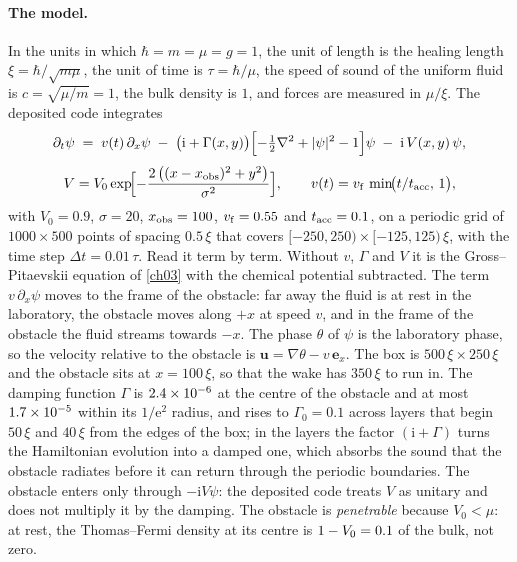 \paragraph{The model.} In the units in which $\hbar=m=\mu=g=1$, the unit of length is the healing length $\xi=\hbar/\sqrt{m\mu}$, the unit of time is $\tau=\hbar/\mu$, the speed of sound of the uniform fluid is $c=\sqrt{\mu/m}=1$, the bulk density is $1$, and forces are measured in $\mu/\xi$. The deposited code integrates
\begin{equation}\label{ch09:eq-model}
\partial_t\psi \;=\; v(t)\,\partial_x\psi\;-\;\bigl(\mathrm i+\Gamma(x,y)\bigr)\Bigl[-\tfrac12\nabla^2+|\psi|^2-1\Bigr]\psi\;-\;\mathrm i\,V(x,y)\,\psi ,
\end{equation}
\begin{equation}\label{ch09:eq-pot}
V=V_0\exp\!\Bigl[-\frac{2\,\bigl((x-x_{\rm obs})^2+y^2\bigr)}{\sigma^2}\Bigr],\qquad v(t)=v_{\rm f}\,\min\!\bigl(t/t_{\rm acc},\,1\bigr),
\end{equation}
with $V_0=0.9$, $\sigma=20$, $x_{\rm obs}=100$, $v_{\rm f}=0.55$ and $t_{\rm acc}=0.1$, on a periodic grid of $1000\times500$ points of spacing $0.5\,\xi$ that covers $[-250,250)\times[-125,125)\,\xi$, with the time step $\Delta t=0.01\,\tau$. Read it term by term. Without $v$, $\Gamma$ and $V$ it is the Gross--Pitaevskii equation of \cref{ch03} with the chemical potential subtracted. The term $v\,\partial_x\psi$ moves to the frame of the obstacle: far away the fluid is at rest in the laboratory, the obstacle moves along $+x$ at speed $v$, and in the frame of the obstacle the fluid streams towards $-x$. The phase $\theta$ of $\psi$ is the laboratory phase, so the velocity relative to the obstacle is $\mathbf u=\nabla\theta-v\,\mathbf e_x$. The box is $500\,\xi\times250\,\xi$ and the obstacle sits at $x=100\,\xi$, so that the wake has $350\,\xi$ to run in. The damping function $\Gamma$ is $2.4\times10^{-6}$ at the centre of the obstacle and at most $1.7\times10^{-5}$ within its $1/\mathrm e^2$ radius, and rises to $\Gamma_0=0.1$ across layers that begin $50\,\xi$ and $40\,\xi$ from the edges of the box; in the layers the factor $(\mathrm i+\Gamma)$ turns the Hamiltonian evolution into a damped one, which absorbs the sound that the obstacle radiates before it can return through the periodic boundaries. The obstacle enters only through $-\mathrm iV\psi$: the deposited code treats $V$ as unitary and does not multiply it by the damping. The obstacle is \emph{penetrable} because $V_0<\mu$: at rest, the Thomas--Fermi density at its centre is $1-V_0=0.1$ of the bulk, not zero.

